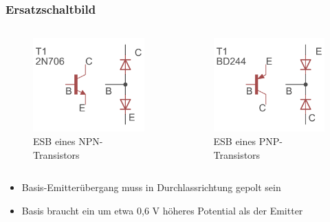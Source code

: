 \begin{frame}
  \frametitle{Ersatzschaltbild}
  \begin{columns}
    \begin{figure}
      \includegraphics[width=\textwidth,height=.5\textheight,keepaspectratio]{a06/NPN_esb.png}
      \caption{ESB eines NPN-Transistors}
    \end{figure}
    \begin{figure}
      \includegraphics[width=\textwidth,height=.5\textheight,keepaspectratio]{e13/PNP_esb.png}
      \caption{ESB eines PNP-Transistors}
    \end{figure}
  \end{columns}
  \begin{itemize}
    \item Basis-Emitterübergang muss in Durchlassrichtung gepolt sein
    \item Basis braucht ein um etwa 0,6 V höheres Potential als der Emitter
  \end{itemize}
\end{frame}


